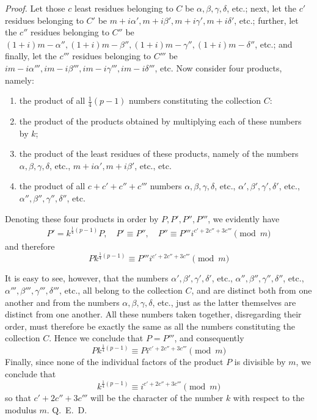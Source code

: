 \emph{Proof.} Let those $c$ least residues belonging to $C$ be $\alpha,\beta,\gamma,\delta$, etc.; next, let the $c'$ residues belonging to $C'$ be $m+i\alpha',m+i\beta',m+i\gamma',m+i\delta'$, etc.; further, let the $c''$ residues belonging to $C''$ be $(1+i)m-\alpha'',(1+i)m-\beta'',(1+i)m-\gamma'',(1+i)m-\delta''$, etc.; and finally, let the $c'''$ residues belonging to $C'''$ be $im-i\alpha''',im-i\beta''',im-i\gamma''',im-i\delta'''$, etc. Now consider four products, namely:
\begin{enumerate}
\renewcommand{\labelenumi}{\arabic{enumi})}
\item the product of all $\frac14(p-1)$ numbers constituting the collection $C$:
\item the product of the products obtained by multiplying each of these numbers by $k$;
\item the product of the least residues of these products, namely of the numbers $\alpha,\beta,\gamma,\delta$, etc., $m+i\alpha',m+i\beta'$, etc., etc.
\item the product of all $c+c'+c''+c'''$ numbers $\alpha,\beta,\gamma,\delta$, etc., $\alpha',\beta',\gamma',\delta'$, etc., $\alpha'',\beta'',\gamma'',\delta''$, etc.
\end{enumerate}
Denoting these four products in order by $P,P',P'',P'''$, we evidently have
\[
\begin{gathered}
P'=k^{\frac14(p-1)}P,\quad P'\equiv P'',\quad
P''\equiv P'''i^{c'+2c''+3c'''}\pmod m
\end{gathered}
\]
and therefore
\[
Pk^{\frac14(p-1)}\equiv P'''i^{c'+2c''+3c'''}\pmod m
\]

It is easy to see, however, that the numbers $\alpha',\allowbreak\beta',\allowbreak\gamma',\allowbreak\delta'$, etc., $\alpha'',\allowbreak\beta'',\allowbreak\gamma'',\allowbreak\delta''$, etc., $\alpha''',\allowbreak\beta''',\allowbreak\gamma''',\allowbreak\delta'''$, etc., all belong to the collection $C$, and are distinct both from one another and from the numbers $\alpha,\allowbreak\beta,\allowbreak\gamma,\allowbreak\delta$, etc., just as the latter themselves are distinct from one another. All these numbers taken together, disregarding their order, must therefore be exactly the same as all the numbers constituting the collection $C$. Hence we conclude that $P=P'''$, and consequently
\[
Pk^{\frac14(p-1)}\equiv Pi^{c'+2c''+3c'''}\pmod m
\]
Finally, since none of the individual factors of the product $P$ is divisible by $m$, we conclude that
\[
k^{\frac14(p-1)}\equiv i^{c'+2c''+3c'''}\pmod m
\]
so that $c'+2c''+3c'''$ will be the character of the number $k$ with respect to the modulus $m$. Q.~E.~D.


